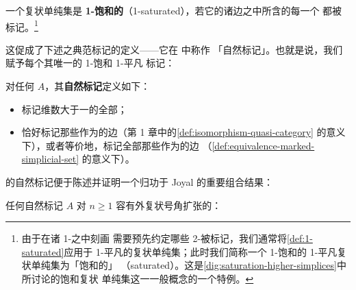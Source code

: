 \begin{definition}[1-饱和的]\label{def:1-saturated}
一个复状单纯集是 \textbf{1-饱和的}（1-saturated），若它的诸边之中所含的每一个%
\trEquivalence{}都被标记。\footnote{由于在诸 1-\trSimplex{}之中刻画\trEquivalence{}%
需要预先约定哪些 2-\trSimplex{}被标记，我们通常将\cref{def:1-saturated}应用于
1-平凡的复状单纯集；此时我们简称一个 1-饱和的 1-平凡复状单纯集为「饱和的」
（saturated）。这是\cref{dig:saturation-higher-simplices}中所讨论的饱和复状
单纯集这一一般概念的一个特例。}
\end{definition}

这促成了下述\trQuasiCategory{}之典范标记的定义——它在 \cite{bib78} 中称作
「自然标记」。也就是说，我们赋予每个\trQuasiCategory{}其唯一的 1-饱和 1-平凡
标记：

\begin{definition}[自然标记]\label{def:natural-marking}
对任何\trQuasiCategory{} $A$，其\textbf{自然标记}定义如下：
\begin{itemize}
\item 标记维数大于一的全部\trSimplex{}；
\item 恰好标记那些作为\trIsomorphism{}的边（第 1 章中的\cref{def:isomorphism-quasi-category}
  的意义下），或者等价地，标记全部那些作为\trEquivalence{}的边
  （\cref{def:equivalence-marked-simplicial-set} 的意义下）。
\end{itemize}
\end{definition}

\trQuasiCategory{}的自然标记便于陈述并证明一个归功于 Joyal 的重要组合结果：

\begin{proposition}\label{prop:outer-complicial-horn-fillings}
任何自然标记\trQuasiCategory{} $A$ 对 $n\ge 1$ 容有外复状号角扩张的\trFiller：
\begin{center}
\qquad
{}
\end{center}
\end{proposition}

